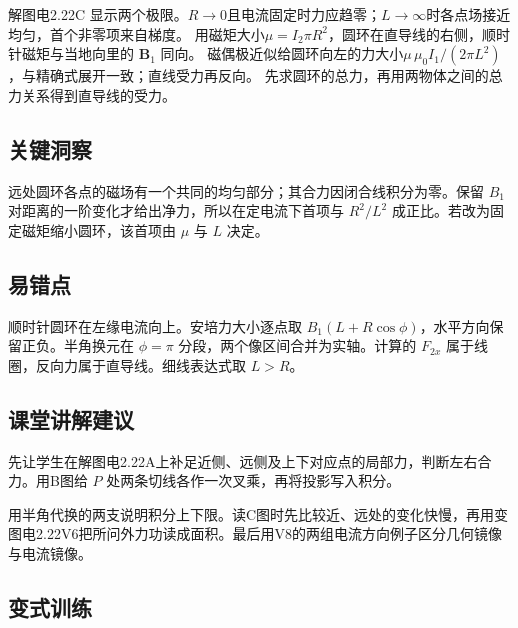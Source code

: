 \documentclass[UTF8,fontset=fandol,a4paper,11pt]{ctexart}
\newcommand{\vect}[1]{\bm{#1}}
\begin{document}
解图电2.22C 显示两个极限。$R\to0$且电流固定时力应趋零；$L\to\infty$时各点场接近均匀，首个非零项来自梯度。
用磁矩大小$\mu=I_2\pi R^2$，圆环在直导线的右侧，顺时针磁矩与当地向里的 $\vect B_1$ 同向。
磁偶极近似给圆环向左的力大小$\mu\,\mu_0I_1/(2\pi L^2)$，与精确式展开一致；直线受力再反向。
先求圆环的总力，再用两物体之间的总力关系得到直导线的受力。




\subsection*{关键洞察}

远处圆环各点的磁场有一个共同的均匀部分；其合力因闭合线积分为零。保留 $B_1$ 对距离的一阶变化才给出净力，所以在定电流下首项与 $R^2/L^2$ 成正比。若改为固定磁矩缩小圆环，该首项由 $\mu$ 与 $L$ 决定。



\subsection*{易错点}

顺时针圆环在左缘电流向上。安培力大小逐点取 $B_1(L+R\cos\phi)$，水平方向保留正负。半角换元在 $\phi=\pi$ 分段，两个像区间合并为实轴。计算的 $F_{2x}$ 属于线圈，反向力属于直导线。细线表达式取 $L>R$。



\subsection*{课堂讲解建议}

先让学生在解图电2.22A上补足近侧、远侧及上下对应点的局部力，判断左右合力。用B图给 $P$ 处两条切线各作一次叉乘，再将投影写入积分。

用半角代换的两支说明积分上下限。读C图时先比较近、远处的变化快慢，再用变图电2.22V6把所问外力功读成面积。最后用V8的两组电流方向例子区分几何镜像与电流镜像。


\subsection*{变式训练}
\end{document}
